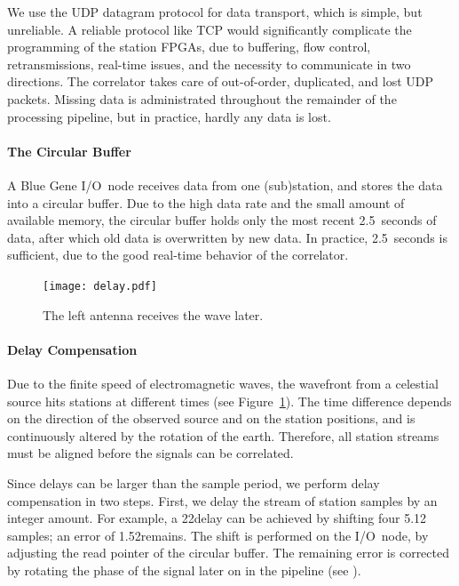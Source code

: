 We use the UDP datagram protocol for data transport, which is simple, but
unreliable.
A reliable protocol like TCP would significantly complicate the programming of
the station FPGAs, due to buffering, flow control, retransmissions, real-time
issues, and the necessity to communicate in two directions.
The correlator takes care of out-of-order, duplicated, and lost UDP packets.
Missing data is administrated throughout the remainder of the processing
pipeline, but in practice, hardly any data is lost.


\paragraph{The Circular Buffer }
A Blue Gene I/O~node receives data from one (sub)station, and stores the
data into a circular buffer.
Due to the high data rate and the small amount of available memory,
the circular buffer holds only the most recent 2.5~seconds of data, after
which old data is overwritten by new data.
In practice, 2.5~seconds is sufficient, due to the good real-time behavior of
the correlator.


\begin{figure}
\vspace{-5mm}
\begin{center}
\texttt{[image: delay.pdf]}
\end{center}
\caption{The left antenna receives the wave later.\vspace{-4mm}}
\label{fig:delay}
\end{figure}
\paragraph{Delay Compensation }
Due to the finite speed of electromagnetic waves, the wavefront from a
celestial source hits stations at different times
(see Figure~\ref{fig:delay}).
The time difference depends on the direction of the observed source and on the
station positions, and is continuously altered by the rotation of the earth.
Therefore, all station streams must be aligned before the signals can be
correlated.

Since delays can be larger than the sample period, we perform delay
compensation in two steps.
First, we delay the stream of station samples by an integer amount.
For example, a 22\us delay can be achieved by shifting four 5.12\us
samples; an error of 1.52\us remains.
The shift is performed on the I/O~node, by adjusting the read pointer of the
circular buffer.
The remaining error is corrected by rotating the phase of the signal later on
in the pipeline (see ).


